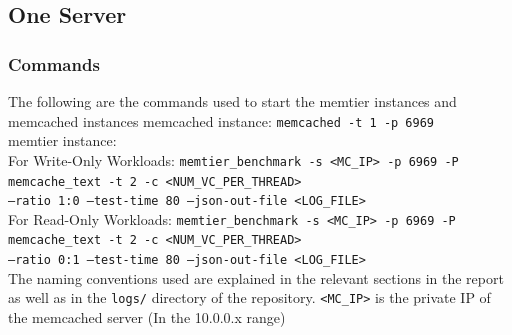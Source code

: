 \documentclass[11pt,a4paper]{article}
\newcommand\instructions[1]{\textcolor{blue}{Instructions: #1}}
\begin{document}

\subsection{One Server}





\subsubsection{Commands}
The following are the commands used to start the memtier instances and memcached instances
{\scriptsize{memcached instance: \texttt{memcached -t 1 -p 6969} \\
memtier instance: \\
For Write-Only Workloads: 
						 \texttt{memtier\_benchmark -s <MC\_IP> -p 6969 -P memcache\_text -t 2 -c <NUM\_VC\_PER\_THREAD> \\ --ratio 1:0 --test-time 80 --json-out-file <LOG\_FILE> } \\
For Read-Only Workloads: 
						 \texttt{memtier\_benchmark -s <MC\_IP> -p 6969 -P memcache\_text -t 2 -c <NUM\_VC\_PER\_THREAD> \\ --ratio 0:1 --test-time 80 --json-out-file <LOG\_FILE> } }} \\
The naming conventions used are explained in the relevant sections in the report as well as in the \texttt{logs/} directory of the repository. \texttt{<MC\_IP>} is the private IP of the memcached server (In the 10.0.0.x range)
\end{document}
